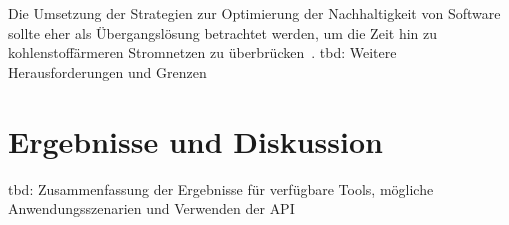 Die Umsetzung der Strategien zur Optimierung der Nachhaltigkeit von Software sollte eher als Übergangslösung betrachtet werden, um die Zeit hin zu kohlenstoffärmeren Stromnetzen zu überbrücken~\cite{WattTime.12.3.2024}.
tbd: Weitere Herausforderungen und Grenzen

%
%

\section{Ergebnisse und Diskussion}
tbd: Zusammenfassung der Ergebnisse für verfügbare Tools, mögliche Anwendungsszenarien und Verwenden der \ac{API}
%
%
